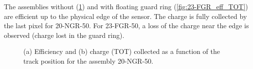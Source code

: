 The assemblies without (\cref{fig:20-NGR_eff_TOT}) and with floating
guard ring (\cref{fig:23-FGR_eff_TOT}) are efficient up to the
physical edge of the sensor. The charge is fully collected by the last
pixel for 20-NGR-50. For 23-FGR-50, a loss of the charge near the edge
is observed (charge lost in the guard ring).

\begin{figure}[htbp]
  \begin{subfigure}[b]{0.5\textwidth}
    \centering
    \caption{}
  \end{subfigure}\hfill
  \begin{subfigure}[b]{0.5\textwidth}
    \centering
    \caption{}
  \end{subfigure}
  \caption{(a) Efficiency and (b) charge (TOT) collected as a function of the
    track position for the assembly 20-NGR-50.}
  \label{fig:20-NGR_eff_TOT}
\end{figure}


